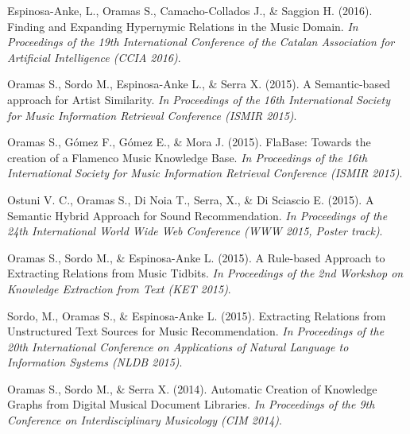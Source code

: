 \vspace{0.2cm}

Espinosa-Anke, L., Oramas S., Camacho-Collados J., \& Saggion H. (2016). Finding and Expanding Hypernymic Relations in the Music Domain. \emph{In Proceedings of the 19th International Conference of the Catalan Association for Artificial Intelligence (CCIA 2016)}.

\vspace{0.2cm}

Oramas S., Sordo M., Espinosa-Anke L., \& Serra X. (2015). A Semantic-based approach for Artist Similarity. \emph{In Proceedings of the 16th International Society for Music Information Retrieval Conference (ISMIR 2015)}.

\vspace{0.2cm}

Oramas S., Gómez F., Gómez E., \& Mora J. (2015). FlaBase: Towards the creation of a Flamenco Music Knowledge Base. \emph{In Proceedings of the 16th International Society for Music Information Retrieval Conference (ISMIR 2015)}.

\vspace{0.2cm}

Ostuni V. C., Oramas S., Di Noia T., Serra, X., \& Di Sciascio E. (2015). A Semantic Hybrid Approach for Sound Recommendation. \emph{In Proceedings of the 24th International World Wide Web Conference (WWW 2015, Poster track)}.

\vspace{0.2cm}

Oramas S., Sordo M., \& Espinosa-Anke L. (2015). A Rule-based Approach to Extracting Relations from Music Tidbits. \emph{In Proceedings of the 2nd Workshop on Knowledge Extraction from Text (KET 2015)}.

\vspace{0.2cm}

Sordo, M., Oramas S., \& Espinosa-Anke L. (2015). Extracting Relations from Unstructured Text Sources for Music Recommendation. \emph{In Proceedings of the 20th International Conference on Applications of Natural Language to Information Systems (NLDB 2015)}.

\vspace{0.2cm}

Oramas S., Sordo M., \& Serra X. (2014). Automatic Creation of Knowledge Graphs from Digital Musical Document Libraries. \emph{In Proceedings of the 9th Conference on Interdisciplinary Musicology (CIM 2014)}.

\vspace{0.2cm}

